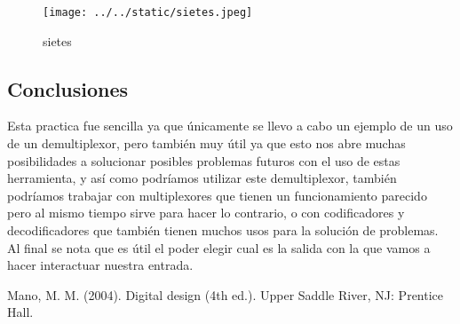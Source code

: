 \documentclass{article}
\begin{document}
\begin{figure}[H]
	\centering
	\texttt{[image: ../../static/sietes.jpeg]}	
	\caption{sietes}
	\label{fig:6}	
\end{figure}

\begin{multicols}{2}
\section{Conclusiones}\label{sec:conclusion}
Esta practica fue sencilla ya que únicamente se llevo a cabo un ejemplo de un uso de un demultiplexor, pero también muy útil ya que esto nos abre muchas posibilidades a solucionar posibles problemas futuros con el uso de estas herramienta, y así como podríamos utilizar este demultiplexor, también podríamos trabajar con multiplexores que tienen un funcionamiento parecido pero al mismo tiempo sirve para hacer lo contrario, o con codificadores y decodificadores que también tienen muchos usos para la solución de problemas. Al final se nota que es útil el poder elegir cual es la salida con la que vamos a hacer interactuar nuestra entrada.

\begin{thebibliography}{1}						%
Mano, M. M. (2004). Digital design (4th ed.). Upper Saddle River, NJ: Prentice Hall.
\end{thebibliography}
\end{multicols}
\end{document}
